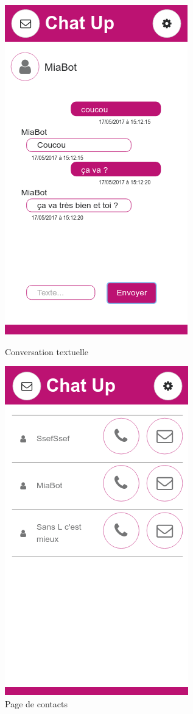 \begin{figure}[H]
   \begin{minipage}[c]{.46\linewidth}
		\centering \includegraphics[scale=0.5]{img/04Messagerie.png}
		\caption{Conversation textuelle}
   \end{minipage} \hfill
   \begin{minipage}[c]{.46\linewidth}
		\centering \includegraphics[scale=0.5]{img/06ContactMessagerie.png}
		\caption{Page de contacts}
   \end{minipage}
\end{figure}


